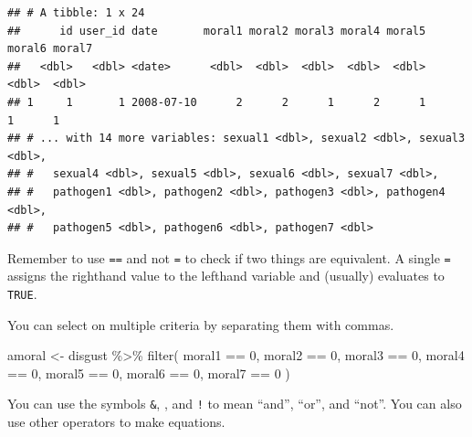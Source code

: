 \documentclass[
  oneside]{book}
\newenvironment{Shaded}{\begin{snugshade}}{\end{snugshade}}
\newcommand{\DecValTok}[1]{\textcolor[rgb]{0.00,0.00,0.81}{#1}}
\newcommand{\FunctionTok}[1]{\textcolor[rgb]{0.00,0.00,0.00}{#1}}
\newcommand{\NormalTok}[1]{#1}
\newcommand{\OtherTok}[1]{\textcolor[rgb]{0.56,0.35,0.01}{#1}}
\newcommand{\SpecialCharTok}[1]{\textcolor[rgb]{0.00,0.00,0.00}{#1}}
\begin{document}
\begin{verbatim}
## # A tibble: 1 x 24
##      id user_id date       moral1 moral2 moral3 moral4 moral5 moral6 moral7
##   <dbl>   <dbl> <date>      <dbl>  <dbl>  <dbl>  <dbl>  <dbl>  <dbl>  <dbl>
## 1     1       1 2008-07-10      2      2      1      2      1      1      1
## # ... with 14 more variables: sexual1 <dbl>, sexual2 <dbl>, sexual3 <dbl>,
## #   sexual4 <dbl>, sexual5 <dbl>, sexual6 <dbl>, sexual7 <dbl>,
## #   pathogen1 <dbl>, pathogen2 <dbl>, pathogen3 <dbl>, pathogen4 <dbl>,
## #   pathogen5 <dbl>, pathogen6 <dbl>, pathogen7 <dbl>
\end{verbatim}

\begin{warning}
Remember to use \texttt{==} and not \texttt{=} to check if two things are equivalent. A single \texttt{=} assigns the righthand value to the lefthand variable and (usually) evaluates to \texttt{TRUE}.

\end{warning}

You can select on multiple criteria by separating them with commas.

\begin{Shaded}
\begin{Highlighting}[]
\NormalTok{amoral }\OtherTok{\textless{}{-}}\NormalTok{ disgust }\SpecialCharTok{\%\textgreater{}\%} \FunctionTok{filter}\NormalTok{(}
\NormalTok{  moral1 }\SpecialCharTok{==} \DecValTok{0}\NormalTok{, }
\NormalTok{  moral2 }\SpecialCharTok{==} \DecValTok{0}\NormalTok{,}
\NormalTok{  moral3 }\SpecialCharTok{==} \DecValTok{0}\NormalTok{, }
\NormalTok{  moral4 }\SpecialCharTok{==} \DecValTok{0}\NormalTok{,}
\NormalTok{  moral5 }\SpecialCharTok{==} \DecValTok{0}\NormalTok{,}
\NormalTok{  moral6 }\SpecialCharTok{==} \DecValTok{0}\NormalTok{,}
\NormalTok{  moral7 }\SpecialCharTok{==} \DecValTok{0}
\NormalTok{)}
\end{Highlighting}
\end{Shaded}

You can use the symbols \texttt{\&}, \texttt{\textbar{}}, and \texttt{!} to mean ``and'', ``or'', and ``not''. You can also use other operators to make equations.
\end{document}
